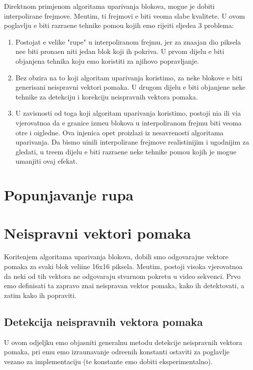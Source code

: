 Direktnom primjenom algoritama uparivanja blokova, mogu\cj e je dobiti interpolirane frejmove. Me\dj utim, ti frejmovi \cj e biti veoma slabe kvalitete. U ovom poglavlju \cj e biti razra\dj ene tehnike pomo\cj u kojih
\cj emo rije\sh iti sljede\cj a 3 problema:
\begin{enumerate}
	\item Postojat \cj e velike "rupe" u interpoliranom frejmu, jer za zna\ch ajan dio piksela ne\cj e biti prona\dj en niti jedan blok koji ih pokriva. U prvom dijelu \cj e biti obja\sh njena tehnika koju \cj emo koristiti
	za njihovo popravljanje.
	\item Bez obzira na to koji algoritam uparivanja koristimo, za neke blokove \cj e biti generisani neispravni vektori pomaka. U drugom dijelu \cj e biti obja\sh njene neke tehnike za detekciju i korekciju
	neispravnih vektora pomaka.
	\item U zavisnosti od toga koji algoritam uparivanja koristimo, postoji ni\zh a ili vi\sh a vjerovatno\cj a da \cj e granice izme\dj u blokova u interpoliranom frejmu biti veoma o\sh tre i o\ch igledne. Ova 
	\ch injenica opet proizlazi iz nesavr\sh enosti algoritama uparivanja. Da bismo u\ch inili interpolirane frejmove realisti\ch nijim i ugodnijim za gledati, u tre\cj em dijelu \cj e biti razra\dj ene neke tehnike pomo\cj u kojih je
	mogu\cj e umanjiti ovaj efekat.
\end{enumerate}

\section{Popunjavanje rupa}

\section{Neispravni vektori pomaka}
Kori\sh tenjem algoritama uparivanja blokova, dobili smo odgovaraju\cj e vektore pomaka za svaki blok veli\ch ine 16x16 piksela. Me\dj utim, postoji visoka vjerovatno\cj a da neki od tih vektora ne odgovaraju stvarnom pokretu
u video sekvenci. Prvo \cj emo definisati \sh ta zapravo zna\ch i neispravan vektor pomaka, kako ih detektovati, a zatim kako ih popraviti. %

\subsection{Detekcija neispravnih vektora pomaka} %
U ovom odjeljku \cj emo objasniti generalnu metodu detekcije neispravnih vektora pomaka, pri \ch emu \cj emo izra\ch unavanje odre\dj enih konstanti ostaviti za poglavlje vezano za implementaciju (te konstante \cj emo dobiti
eksperimentalno).

